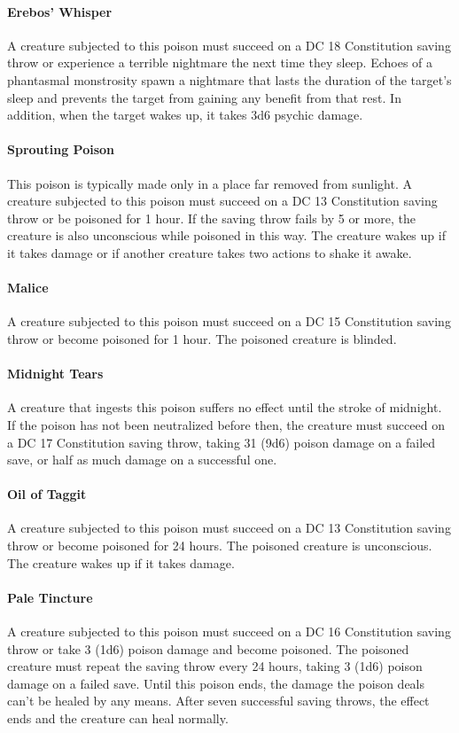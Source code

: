    \paragraph{Erebos' Whisper}
        A creature subjected to this poison must succeed on a DC 18 Constitution saving throw or experience a terrible nightmare the next time they sleep.
        Echoes of a phantasmal monstrosity spawn a nightmare that lasts the duration of the target's sleep and prevents the target from gaining any benefit from that rest.
        In addition, when the target wakes up, it takes 3d6 psychic damage.
    \paragraph{Sprouting Poison}
        This poison is typically made only in a place far removed from sunlight.
        A creature subjected to this poison must succeed on a DC 13 Constitution saving throw or be poisoned for 1 hour.
        If the saving throw fails by 5 or more, the creature is also unconscious while poisoned in this way.
        The creature wakes up if it takes damage or if another creature takes two actions to shake it awake.
    \paragraph{Malice}
        A creature subjected to this poison must succeed on a DC 15 Constitution saving throw or become poisoned for 1 hour.
        The poisoned creature is blinded.
    \paragraph{Midnight Tears}
        A creature that ingests this poison suffers no effect until the stroke of midnight.
        If the poison has not been neutralized before then, the creature must succeed on a DC 17 Constitution saving throw, taking 31 (9d6) poison damage on a failed save, or half as much damage on a successful one.
    \paragraph{Oil of Taggit}
        A creature subjected to this poison must succeed on a DC 13 Constitution saving throw or become poisoned for 24 hours.
        The poisoned creature is unconscious.
        The creature wakes up if it takes damage.
    \paragraph{Pale Tincture}
        A creature subjected to this poison must succeed on a DC 16 Constitution saving throw or take 3 (1d6) poison damage and become poisoned.
        The poisoned creature must repeat the saving throw every 24 hours, taking 3 (1d6) poison damage on a failed save.
        Until this poison ends, the damage the poison deals can't be healed by any means.
        After seven successful saving throws, the effect ends and the creature can heal normally.
